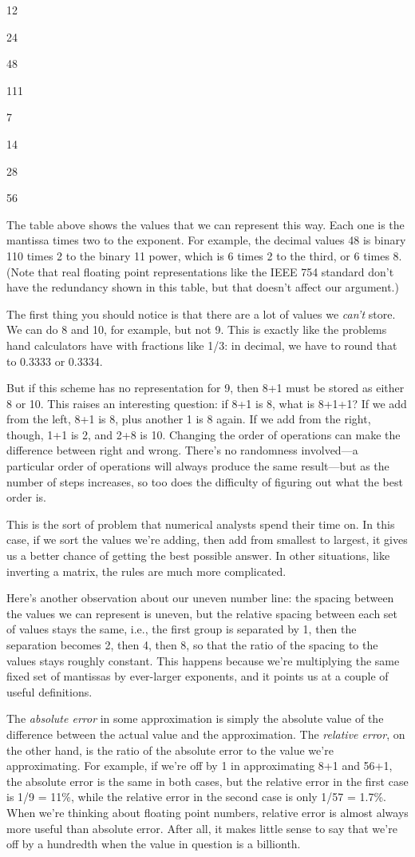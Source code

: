 \documentclass[]{book}
\newcommand{\gdef}[2]{\emph{#2}}
\begin{document}
12

24

48

111

7

14

28

56

The table above shows the values that we can represent this way. Each
one is the mantissa times two to the exponent. For example, the decimal
values 48 is binary 110 times 2 to the binary 11 power, which is 6 times
2 to the third, or 6 times 8. (Note that real floating point
representations like the IEEE 754 standard don't have the redundancy
shown in this table, but that doesn't affect our argument.)

The first thing you should notice is that there are a lot of values we
\emph{can't} store. We can do 8 and 10, for example, but not 9. This is
exactly like the problems hand calculators have with fractions like 1/3:
in decimal, we have to round that to 0.3333 or 0.3334.

But if this scheme has no representation for 9, then 8+1 must be stored
as either 8 or 10. This raises an interesting question: if 8+1 is 8,
what is 8+1+1? If we add from the left, 8+1 is 8, plus another 1 is 8
again. If we add from the right, though, 1+1 is 2, and 2+8 is 10.
Changing the order of operations can make the difference between right
and wrong. There's no randomness involved---a particular order of
operations will always produce the same result---but as the number of
steps increases, so too does the difficulty of figuring out what the
best order is.

This is the sort of problem that numerical analysts spend their time on.
In this case, if we sort the values we're adding, then add from smallest
to largest, it gives us a better chance of getting the best possible
answer. In other situations, like inverting a matrix, the rules are much
more complicated.

Here's another observation about our uneven number line: the spacing
between the values we can represent is uneven, but the relative spacing
between each set of values stays the same, i.e., the first group is
separated by 1, then the separation becomes 2, then 4, then 8, so that
the ratio of the spacing to the values stays roughly constant. This
happens because we're multiplying the same fixed set of mantissas by
ever-larger exponents, and it points us at a couple of useful
definitions.

The \gdef{g:absolute-error}{absolute error} in some approximation is
simply the absolute value of the difference between the actual value and
the approximation. The \gdef{g:relative-error}{relative error}, on
the other hand, is the ratio of the absolute error to the value we're
approximating. For example, if we're off by 1 in approximating 8+1 and
56+1, the absolute error is the same in both cases, but the relative
error in the first case is 1/9 = 11\%, while the relative error in the
second case is only 1/57 = 1.7\%. When we're thinking about floating
point numbers, relative error is almost always more useful than absolute
error. After all, it makes little sense to say that we're off by a
hundredth when the value in question is a billionth.
\end{document}
